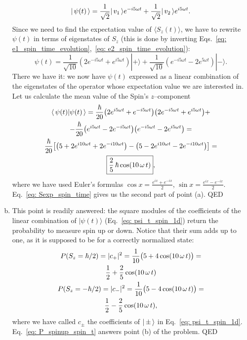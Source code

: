 \begin{enumerate}[(a)]
\begin{equation}
        | \, \psi (t) \, \rangle = \frac{1}{\sqrt{2}}  | \, v_1 \, \rangle e^{-i 5 \omega t} + \frac{1}{\sqrt{2}} | \, v_2 \, \rangle e^{i 5 \omega t}.
    \end{equation}
    Since we need to find the expectation value of $\langle S_z(t) \rangle$, we have to rewrite $\psi(t)$ in terms of eigenstates of $S_z$ (this is done by inverting Eqs.~\eqref{eq: e1_spin_time_evolution},~\eqref{eq: e2_spin_time_evolution}):
    \begin{equation}
        \label{eq: psi_t_spin_1d}
        \psi(t) = \frac{1}{\sqrt{10}} ( 2 e^{-i 5 \omega t} + e^{i5 \omega t} ) | + \rangle + \frac{1}{\sqrt{10}} ( e^{-i 5 \omega t} - 2 e^{5 \omega t} ) | - \rangle.
    \end{equation}
    There we have it: we now have $\psi(t)$ expressed as a linear combination of the eigenstates of the operator whose expectation value we are interested in. Let us calculate the mean value of the Spin's $z$--component
    \begin{gather}
        \langle \,  \psi (t) | \psi (t) \, \rangle = \frac{\hbar}{20} \bigl( 2 e^{i 5 \omega t} + e^{-i 5 \omega t} \bigr) \bigl( 2 e^{-i 5 \omega t} + e^{i5 \omega t} \bigr) + \notag \\
        - \frac{\hbar}{20} \bigl( e^{i 5 \omega t} - 2 e^{-i 5 \omega t} \bigr) \bigl( e^{-i 5 \omega t} - 2 e^{i 5 \omega t} \bigr) = \notag \\
        \frac{\hbar}{20} \bigl[ \bigl( 5 + 2e^{i 10 \omega t} + 2e^{-i 10 \omega t} \bigr) - \bigl( 5 - 2e^{i 10 \omega t} - 2e^{-i 10 \omega t} \bigr) \bigr] = \notag \\
        \boxed{\frac{2}{5} \, \hbar \cos (10 \, \omega \, t)} \label{eq: Sexp_spin_time},
    \end{gather}
    where we have used Euler's formulas $ \cos x = \frac{e^{ix} + e^{-ix}}{2} $, $ \sin x = \frac{e^{ix} - e^{-ix}}{2} $. Eq.~\eqref{eq: Sexp_spin_time} gives us the second part of point (a). QED
    \item This point is readily answered: the square modules of the coefficients of the linear combination of $| \psi (t) \rangle$ (Eq.~\eqref{eq: psi_t_spin_1d}) return the probability to measure spin up or down. Notice that their sum adds up to one, as it is supposed to be for a correctly normalized state:
    \begin{gather}
        P(S_z = \hbar/2) = | c_+ |^2 = \frac{1}{10} \bigl( 5 + 4 \cos (10 \, \omega \, t) \bigr) = \notag \\
        \frac{1}{2} + \frac{2}{5} \cos (10 \, \omega \, t) \label{eq: P_spinup_spin_t} \\
        P(S_z = - \hbar/2) = | c_- |^2 = \frac{1}{10} \bigl( 5 - 4 \cos (10 \, \omega \, t) \bigr) = \notag \\
        \frac{1}{2} - \frac{2}{5} \cos (10 \, \omega \, t) \label{eq: P_spindown_spin_t}, 
    \end{gather}
    where we have called $c_\pm$ the coefficients of $ | \, \pm \, \rangle $ in Eq.~\eqref{eq: psi_t_spin_1d}. Eq.~\eqref{eq: P_spinup_spin_t} answers point (b) of the problem. QED 
\end{enumerate}
